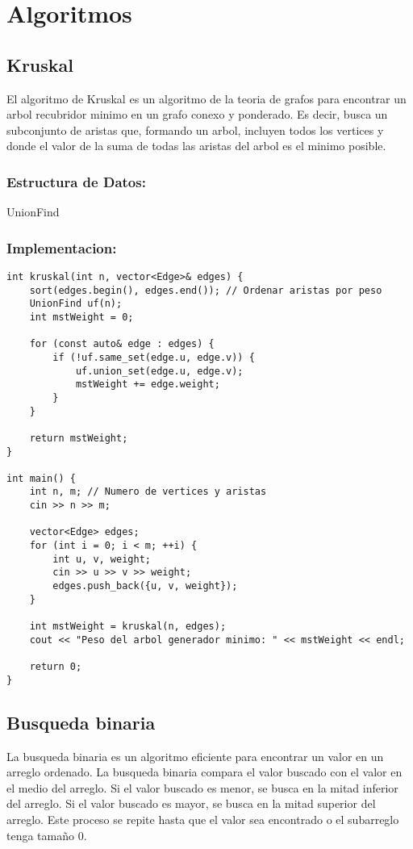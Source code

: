 \section{Algoritmos}

\subsection{Kruskal}
El algoritmo de Kruskal es un algoritmo de la teoria de grafos para encontrar un arbol recubridor minimo en un grafo conexo y ponderado. Es decir, busca un subconjunto de aristas que, formando un arbol, incluyen todos los vertices y donde el valor de la suma de todas las aristas del arbol es el minimo posible.

\subsubsection{Estructura de Datos:}
UnionFind

\subsubsection{Implementacion:}
\begin{lstlisting}[style=cpp]
int kruskal(int n, vector<Edge>& edges) {
    sort(edges.begin(), edges.end()); // Ordenar aristas por peso
    UnionFind uf(n);
    int mstWeight = 0;

    for (const auto& edge : edges) {
        if (!uf.same_set(edge.u, edge.v)) {
            uf.union_set(edge.u, edge.v);
            mstWeight += edge.weight;
        }
    }

    return mstWeight;
}

int main() {
    int n, m; // Numero de vertices y aristas
    cin >> n >> m;

    vector<Edge> edges;
    for (int i = 0; i < m; ++i) {
        int u, v, weight;
        cin >> u >> v >> weight;
        edges.push_back({u, v, weight});
    }

    int mstWeight = kruskal(n, edges);
    cout << "Peso del arbol generador minimo: " << mstWeight << endl;

    return 0;
}
\end{lstlisting}

\subsection{Busqueda binaria}
La busqueda binaria es un algoritmo eficiente para encontrar un valor en un arreglo ordenado. La busqueda binaria compara el valor buscado con el valor en el medio del arreglo. Si el valor buscado es menor, se busca en la mitad inferior del arreglo. Si el valor buscado es mayor, se busca en la mitad superior del arreglo. Este proceso se repite hasta que el valor sea encontrado o el subarreglo tenga tamaño 0. 

